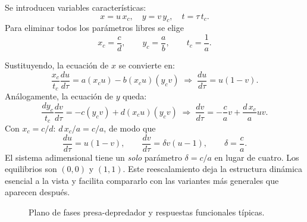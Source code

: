 \documentclass[11pt,letterpaper]{article}
\begin{document}
Se introducen variables características:
\[
x=u\,x_c,\quad y=v\,y_c,\quad t=\tau\,t_c.
\]
Para eliminar todos los parámetros libres se elige
\[
x_c=\frac{c}{d},\qquad y_c=\frac{a}{b},\qquad t_c=\frac{1}{a}.
\]

Sustituyendo, la ecuación de $x$ se convierte en:
\[
\frac{x_c}{t_c}\frac{du}{d\tau}=a(x_c u)-b(x_c u)(y_c v)
\;\Longrightarrow\;
\frac{du}{d\tau}=u(1-v).
\]
Análogamente, la ecuación de $y$ queda:
\[
\frac{dy_c}{t_c}\frac{dv}{d\tau}=-c(y_c v)+d(x_c u)(y_c v)
\;\Longrightarrow\;
\frac{dv}{d\tau}=-\frac{c}{a}v+\frac{d\,x_c}{a}uv.
\]
Con $x_c=c/d$: $d\,x_c/a=c/a$, de modo que
\[
\boxed{\frac{du}{d\tau}=u(1-v),\qquad
\frac{dv}{d\tau}=\delta v(u-1),\qquad \delta=\frac{c}{a}.}
\]
El sistema adimensional tiene un \emph{solo} parámetro $\delta=c/a$ en lugar de cuatro.
Los equilibrios son $(0,0)$ y $(1,1)$.
Este reescalamiento deja la estructura dinámica esencial a la vista y facilita
compararlo con las variantes más generales que aparecen después.

\begin{figure}[H]
\centering
\begin{minipage}[t]{0.56\textwidth}
\centering
{}
\end{minipage}
\hfill
\begin{minipage}[t]{0.40\textwidth}
\centering
{}
\end{minipage}
\caption{Plano de fases presa-depredador y respuestas funcionales típicas.}
\end{figure}
\end{document}
